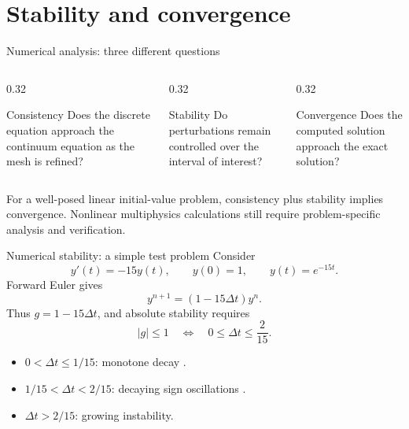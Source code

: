 \documentclass[aspectratio=169,11pt]{beamer}
\begin{document}
\section{Stability and convergence}

\begin{frame}{Numerical analysis: three different questions}
\begin{columns}[T,onlytextwidth]
\begin{column}{0.32\textwidth}
\begin{block}{Consistency}
Does the discrete equation approach the continuum equation as the mesh is refined?
\end{block}
\end{column}
\begin{column}{0.32\textwidth}
\begin{block}{Stability}
Do perturbations remain controlled over the interval of interest?
\end{block}
\end{column}
\begin{column}{0.32\textwidth}
\begin{block}{Convergence}
Does the computed solution approach the exact solution?
\end{block}
\end{column}
\end{columns}
\begin{punchbox}
\small For a well-posed linear initial-value problem, consistency plus stability implies convergence. Nonlinear multiphysics calculations still require problem-specific analysis and verification.
\end{punchbox}
\end{frame}

\begin{frame}{Numerical stability: a simple test problem}
Consider
\[
  y'(t)=-15y(t),
  \qquad
  y(0)=1,
  \qquad
  y(t)=e^{-15t}.
\]
Forward Euler gives
\[
  y^{n+1}=(1-15\Delta t)y^n.
\]
Thus \(g=1-15\Delta t\), and absolute stability requires
\[
  \boxed{\lvert g\rvert\le1
  \quad\Longleftrightarrow\quad
  0\le\Delta t\le\frac{2}{15}}.
\]
\begin{itemize}\itemsep5pt
  \item \(0<\Delta t\le1/15\): monotone decay .
  \item \(1/15<\Delta t<2/15\): decaying sign oscillations .
  \item \(\Delta t>2/15\): growing instability.
\end{itemize}
\end{frame}
\end{document}
